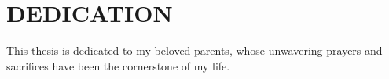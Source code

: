 
\chapter*{DEDICATION}

This thesis is dedicated to my beloved parents, whose unwavering prayers and sacrifices have been the cornerstone of my life. 
